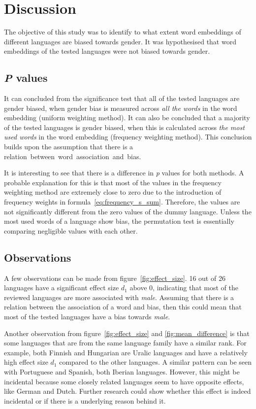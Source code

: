 \section{Discussion}
The objective of this study was to identify to what extent word embeddings of different
languages are biased towards gender.
It was hypothesised that word embeddings of the tested languages were not biased towards
gender.

\subsection{\emph{P} values}
It can concluded from the significance test that all of the tested languages are
gender biased, when gender bias is measured across \emph{all the words} in the
word embedding (uniform weighting method).
It can also be concluded that a majority of the tested languages is gender biased,
when this is calculated across \emph{the most used words} in the word
embedding (frequency weighting method). This conclusion builds
upon the assumption that there is a \mbox{relation between word association and bias.}

It is interesting to see that there is a difference in \emph{p} values for both methods.
A probable explanation for this is that most of the values in the frequency weighting
method are extremely close to zero due to the introduction of frequency
weights in formula~\eqref{eq:frequency_s_sum}. Therefore, the values are not
significantly different from
the zero values of the dummy language. 
Unless the most used words of a language
show bias, the permutation test is essentially comparing negligible values with each
other. 

\subsection{Observations}
A few observations can be made from figure~\ref{fig:effect_size}. 16 out of 26
languages have a significant effect size $d_1$ above 0, indicating that most of
the reviewed
languages are more associated with \emph{male}. Assuming that there is a relation between
the association of a word and bias, then this could mean that
most of the tested languages have a bias towards \emph{male}. 

Another observation from figure~\ref{fig:effect_size} and \ref{fig:mean_difference} is that
some languages that are from the same language family have
a similar rank. For example, both Finnish and Hungarian
are Uralic languages and have a
relatively high effect size $d_1$ compared to the other
languages. A similar pattern can be seen
with Portuguese and Spanish, both Iberian languages. However, this might be incidental
because some closely related languages seem to have opposite effects, like German and
Dutch. Further research could show whether this effect is indeed incidental or if
there is a underlying reason behind it.

